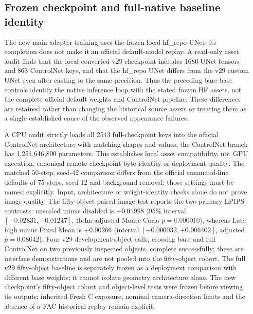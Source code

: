 \documentclass[11pt]{article}
\begin{document}
\subsection*{Frozen checkpoint and full-native baseline identity}
The new main-adapter training uses the frozen local hf\_repo UNet; its completion does not make it an official default-model replay. A read-only asset audit finds that the local converted v29 checkpoint includes 1680 UNet tensors and 863 ControlNet keys, and that the hf\_repo UNet differs from the v29 custom UNet even after casting to the same precision. Thus the preceding bare-base controls identify the native inference loop with the stated frozen HF assets, not the complete official default weights and ControlNet pipeline. These differences are retained rather than changing the historical source assets or treating them as a single established cause of the observed appearance failures.

A CPU audit strictly loads all 2543 full-checkpoint keys into the official ControlNet architecture with matching shapes and values; the ControlNet branch has 1,254,646,800 parameters. This establishes local asset compatibility, not GPU execution, canonical remote checkpoint byte identity or deployment quality. The matched 50-step, seed-42 comparison differs from the official command-line defaults of 75 steps, seed 12 and background removal; those settings must be named explicitly. Input, architecture or weight-identity checks alone do not prove image quality. The fifty-object paired image test reports the two primary LPIPS contrasts: unscaled minus disabled is $-0.01998$ (95\% interval $[-0.02831,-0.01247]$, Holm-adjusted Monte Carlo $p=0.000010$), whereas Late-high minus Fixed Mean is $+0.00266$ (interval $[-0.000032,+0.006402]$, adjusted $p=0.08042$). Four v29 development-object calls, crossing bare and full ControlNet on two previously inspected objects, complete successfully; these are interface demonstrations and are not pooled into the fifty-object cohort. The full v29 fifty-object baseline is separately frozen as a deployment comparison with different base weights; it cannot isolate geometry architecture alone. The new checkpoint's fifty-object cohort and object-level tests were frozen before viewing its outputs; inherited Fresh C exposure, nominal camera-direction limits and the absence of a FAC historical replay remain explicit.
\end{document}
